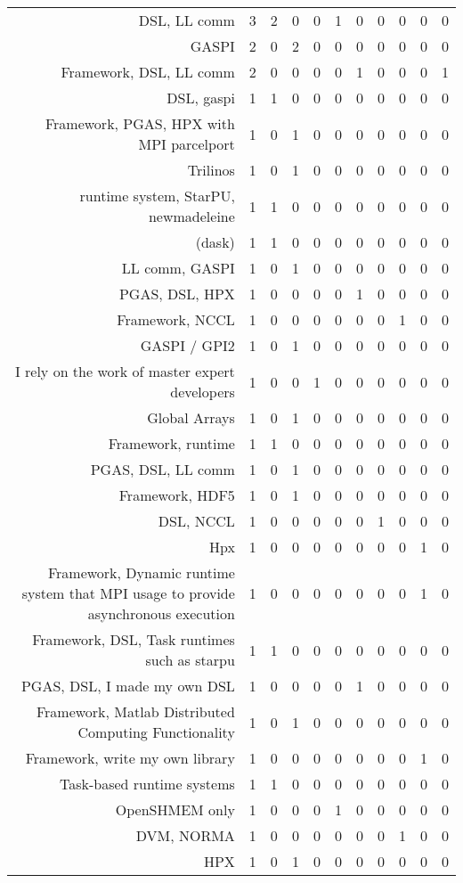 {\begin{landscape}
\begin{longtable}[htb]{r|c|c|c|c|c|c|c|c|c|c}
{DSL, LL comm} & 3 & 2 & 0 & 0 & 1 & 0 & 0 & 0 & 0 & 0 \\%
{GASPI} & 2 & 0 & 2 & 0 & 0 & 0 & 0 & 0 & 0 & 0 \\%
{Framework, DSL, LL comm} & 2 & 0 & 0 & 0 & 0 & 1 & 0 & 0 & 0 & 1 \\%
{DSL, gaspi} & 1 & 1 & 0 & 0 & 0 & 0 & 0 & 0 & 0 & 0 \\%
{Framework, PGAS, HPX with MPI parcelport} & 1 & 0 & 1 & 0 & 0 & 0 & 0 & 0 & 0 & 0 \\%
{Trilinos} & 1 & 0 & 1 & 0 & 0 & 0 & 0 & 0 & 0 & 0 \\%
{runtime system, StarPU, newmadeleine} & 1 & 1 & 0 & 0 & 0 & 0 & 0 & 0 & 0 & 0 \\%
{(dask)} & 1 & 1 & 0 & 0 & 0 & 0 & 0 & 0 & 0 & 0 \\%
{LL comm, GASPI} & 1 & 0 & 1 & 0 & 0 & 0 & 0 & 0 & 0 & 0 \\%
{PGAS, DSL, HPX} & 1 & 0 & 0 & 0 & 0 & 1 & 0 & 0 & 0 & 0 \\%
{Framework, NCCL} & 1 & 0 & 0 & 0 & 0 & 0 & 0 & 1 & 0 & 0 \\%
{GASPI / GPI2} & 1 & 0 & 1 & 0 & 0 & 0 & 0 & 0 & 0 & 0 \\%
{I rely on the work of master expert developers} & 1 & 0 & 0 & 1 & 0 & 0 & 0 & 0 & 0 & 0 \\%
{Global Arrays} & 1 & 0 & 1 & 0 & 0 & 0 & 0 & 0 & 0 & 0 \\%
{Framework, runtime} & 1 & 1 & 0 & 0 & 0 & 0 & 0 & 0 & 0 & 0 \\%
{PGAS, DSL, LL comm} & 1 & 0 & 1 & 0 & 0 & 0 & 0 & 0 & 0 & 0 \\%
{Framework, HDF5} & 1 & 0 & 1 & 0 & 0 & 0 & 0 & 0 & 0 & 0 \\%
{DSL, NCCL} & 1 & 0 & 0 & 0 & 0 & 0 & 1 & 0 & 0 & 0 \\%
{Hpx} & 1 & 0 & 0 & 0 & 0 & 0 & 0 & 0 & 1 & 0 \\%
{Framework, Dynamic runtime system that MPI usage to provide asynchronous execution} & 1 & 0 & 0 & 0 & 0 & 0 & 0 & 0 & 1 & 0 \\%
{Framework, DSL, Task runtimes such as starpu} & 1 & 1 & 0 & 0 & 0 & 0 & 0 & 0 & 0 & 0 \\%
{PGAS, DSL, I made my own DSL} & 1 & 0 & 0 & 0 & 0 & 1 & 0 & 0 & 0 & 0 \\%
{Framework, Matlab Distributed Computing Functionality} & 1 & 0 & 1 & 0 & 0 & 0 & 0 & 0 & 0 & 0 \\%
{Framework, write my own library} & 1 & 0 & 0 & 0 & 0 & 0 & 0 & 0 & 1 & 0 \\%
{Task-based runtime systems} & 1 & 1 & 0 & 0 & 0 & 0 & 0 & 0 & 0 & 0 \\%
{OpenSHMEM only} & 1 & 0 & 0 & 0 & 1 & 0 & 0 & 0 & 0 & 0 \\%
{DVM, NORMA} & 1 & 0 & 0 & 0 & 0 & 0 & 0 & 1 & 0 & 0 \\%
{HPX} & 1 & 0 & 1 & 0 & 0 & 0 & 0 & 0 & 0 & 0 \\%
\hline%
\end{longtable}%
\end{landscape}}%
\clearpage%
